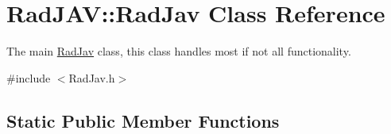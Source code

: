 \hypertarget{class_rad_j_a_v_1_1_rad_jav}{}\section{Rad\+J\+AV\+:\+:Rad\+Jav Class Reference}
\label{class_rad_j_a_v_1_1_rad_jav}


The main \mbox{\hyperlink{class_rad_j_a_v_1_1_rad_jav}{Rad\+Jav}} class, this class handles most if not all functionality.  




{\ttfamily \#include $<$Rad\+Jav.\+h$>$}

\subsection*{Static Public Member Functions}
